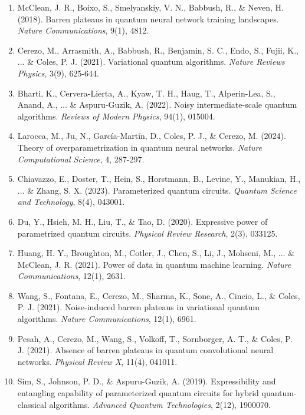 \documentclass[12pt,a4paper]{article}
\begin{document}
\begin{enumerate}
\item McClean, J. R., Boixo, S., Smelyanskiy, V. N., Babbush, R., \& Neven, H. (2018). Barren plateaus in quantum neural network training landscapes. \textit{Nature Communications}, 9(1), 4812.

\item Cerezo, M., Arrasmith, A., Babbush, R., Benjamin, S. C., Endo, S., Fujii, K., ... \& Coles, P. J. (2021). Variational quantum algorithms. \textit{Nature Reviews Physics}, 3(9), 625-644.

\item Bharti, K., Cervera-Lierta, A., Kyaw, T. H., Haug, T., Alperin-Lea, S., Anand, A., ... \& Aspuru-Guzik, A. (2022). Noisy intermediate-scale quantum algorithms. \textit{Reviews of Modern Physics}, 94(1), 015004.

\item Larocca, M., Ju, N., García-Martín, D., Coles, P. J., \& Cerezo, M. (2024). Theory of overparametrization in quantum neural networks. \textit{Nature Computational Science}, 4, 287-297.

\item Chiavazzo, E., Doster, T., Hein, S., Horstmann, B., Levine, Y., Manukian, H., ... \& Zhang, S. X. (2023). Parameterized quantum circuits. \textit{Quantum Science and Technology}, 8(4), 043001.

\item Du, Y., Hsieh, M. H., Liu, T., \& Tao, D. (2020). Expressive power of parametrized quantum circuits. \textit{Physical Review Research}, 2(3), 033125.

\item Huang, H. Y., Broughton, M., Cotler, J., Chen, S., Li, J., Mohseni, M., ... \& McClean, J. R. (2021). Power of data in quantum machine learning. \textit{Nature Communications}, 12(1), 2631.

\item Wang, S., Fontana, E., Cerezo, M., Sharma, K., Sone, A., Cincio, L., \& Coles, P. J. (2021). Noise-induced barren plateaus in variational quantum algorithms. \textit{Nature Communications}, 12(1), 6961.

\item Pesah, A., Cerezo, M., Wang, S., Volkoff, T., Sornborger, A. T., \& Coles, P. J. (2021). Absence of barren plateaus in quantum convolutional neural networks. \textit{Physical Review X}, 11(4), 041011.

\item Sim, S., Johnson, P. D., \& Aspuru-Guzik, A. (2019). Expressibility and entangling capability of parameterized quantum circuits for hybrid quantum-classical algorithms. \textit{Advanced Quantum Technologies}, 2(12), 1900070.


\end{enumerate}
\end{document}
